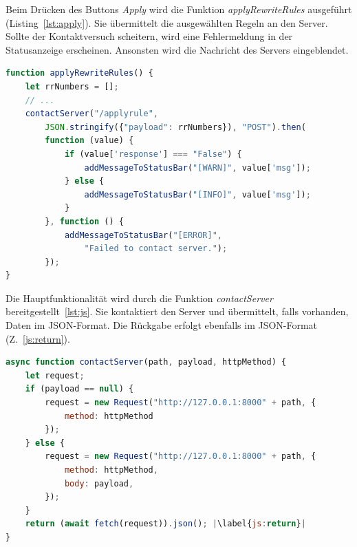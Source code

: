 Beim Drücken des Buttons \textit{Apply} wird die Funktion \textit{applyRewriteRules} ausgeführt (Listing~\ref{lst:apply}).
Sie übermittelt die ausgewählten Regeln an den Server. Sollte der Kontaktversuch scheitern, wird eine Fehlermeldung in der Statusanzeige erscheinen. Ansonsten wird die 
Nachricht des Servers eingeblendet.
\vspace{5mm}


\begin{lstlisting}[language=JavaScript, escapechar=|, caption=Funktion \textit{applyRewriteRules()} aus der Datei \textit{index.js}, label={lst:apply}]
function applyRewriteRules() {
    let rrNumbers = [];
    // ...
    contactServer("/applyrule",
        JSON.stringify({"payload": rrNumbers}), "POST").then(
        function (value) {
            if (value['response'] === "False") {
                addMessageToStatusBar("[WARN]", value['msg']);
            } else {
                addMessageToStatusBar("[INFO]", value['msg']);
            }
        }, function () {
            addMessageToStatusBar("[ERROR]",
                "Failed to contact server.");
        });
}
\end{lstlisting} 















Die Hauptfunktionalität wird durch die Funktion \textit{contactServer} bereitgestellt~\ref{lst:js}. Sie kontaktiert den Server und übermittelt, falls vorhanden, Daten im JSON-Format.
Die Rückgabe erfolgt ebenfalls im JSON-Format (Z.~\ref{js:return}).

\begin{lstlisting}[language=JavaScript, escapechar=|, caption=Auszug aus der Datei \textit{index.js}, label={lst:js}]
async function contactServer(path, payload, httpMethod) {
    let request;
    if (payload == null) {
        request = new Request("http://127.0.0.1:8000" + path, {
            method: httpMethod
        });
    } else {
        request = new Request("http://127.0.0.1:8000" + path, {
            method: httpMethod,
            body: payload,
        });
    }
    return (await fetch(request)).json(); |\label{js:return}|
}
\end{lstlisting} 
    



